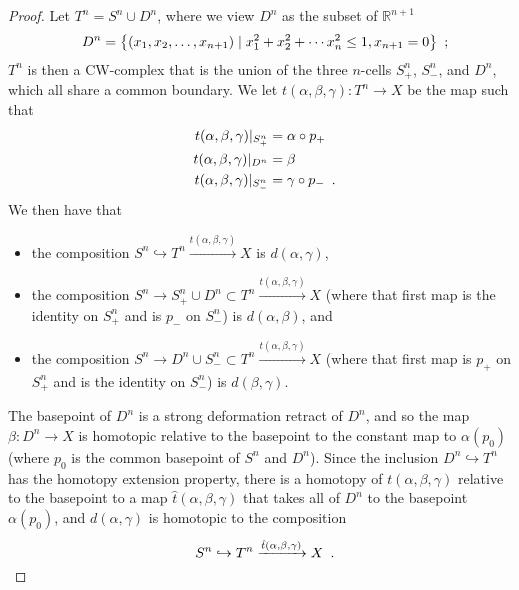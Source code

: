 \documentclass{amsart}
\numberwithin{equation}{section}
\theoremstyle{slplain}
\theoremstyle{definition}
\theoremstyle{remark}
\newcommand{\R}{\mathbb{R}}
\newcommand{\suchthat}{\mid}
\newcommand{\rest}[1]{|_{#1}}
\newcommand{\Period}{\rlap{\enspace .}}
\newcommand{\Semicolon}{\rlap{\enspace ;}}
\begin{document}
\begin{proof}
  Let $T^{n} = S^{n} \cup D^{n}$, where we view $D^{n}$ as the subset
  of $\R^{n+1}$
  \begin{displaymath}
    D^{n} = \bigl\{ (x_{1}, x_{2}, \ldots, x_{n+1}) \suchthat
    x_{1}^{2} + x_{2}^{2} + \cdots x_{n}^{2} \le 1,
    x_{n+1} = 0 \bigr\} \Semicolon
  \end{displaymath}
  $T^{n}$ is then a CW-complex that is the union of the three
  $n$-cells $S^{n}_{+}$, $S^{n}_{-}$, and $D^{n}$, which all share a
  common boundary.  We let $t(\alpha,\beta,\gamma)\colon T^{n} \to X$
  be the map such that
  \begin{align*}
    t(\alpha,\beta,\gamma)\rest{S^{n}_{+}} &= \alpha \circ p_{+}\\
    t(\alpha,\beta,\gamma)\rest{D^{n}} &= \beta\\
    t(\alpha,\beta,\gamma)\rest{S^{n}_{-}} &= \gamma \circ p_{-}
    \Period
  \end{align*}
  We then have that
  \begin{itemize}
  \item the composition $S^{n} \hookrightarrow T^{n}
    \xrightarrow{t(\alpha,\beta,\gamma)} X$ is $d(\alpha,\gamma)$,
  \item the composition $S^{n} \to S^{n}_{+} \cup D^{n} \subset T^{n}
    \xrightarrow{t(\alpha,\beta,\gamma)} X$ (where that first map is
    the identity on $S^{n}_{+}$ and is $p_{-}$ on $S^{n}_{-}$) is
    $d(\alpha,\beta)$, and
  \item the composition $S^{n} \to D^{n} \cup S^{n}_{-} \subset T^{n}
    \xrightarrow{t(\alpha,\beta,\gamma)} X$ (where that first map is
    $p_{+}$ on $S^{n}_{+}$ and is the identity on $S^{n}_{-}$) is
    $d(\beta,\gamma)$.
  \end{itemize}

  The basepoint of $D^{n}$ is a strong deformation retract of $D^{n}$,
  and so the map $\beta\colon D^{n} \to X$ is homotopic relative to
  the basepoint to the constant map to $\alpha(p_{0})$ (where $p_{0}$
  is the common basepoint of $S^{n}$ and $D^{n}$).  Since the
  inclusion $D^{n} \hookrightarrow T^{n}$ has the homotopy extension
  property, there is a homotopy of $t(\alpha,\beta,\gamma)$ relative
  to the basepoint to a map $\hat t(\alpha,\beta,\gamma)$ that takes
  all of $D^{n}$ to the basepoint $\alpha(p_{0})$, and
  $d(\alpha,\gamma)$ is homotopic to the composition
  \begin{displaymath}
    S^{n} \hookrightarrow T^{n}
    \xrightarrow{\hat t(\alpha,\beta,\gamma)} X \Period
  \end{displaymath}


\end{proof}
\end{document}
